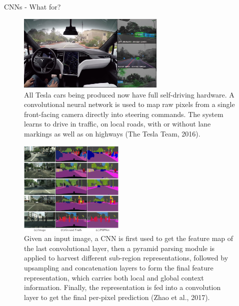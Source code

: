 \begin{vbframe}{CNNs - What for?}
  \begin{figure}
    \centering
    \includegraphics[width=7cm]{figure/tesla_autopilot.jpg}
    \caption{All Tesla cars being produced now have full self-driving hardware. A convolutional neural network is used to map raw pixels from a single front-facing camera directly into steering commands. The system learns to drive in traffic, on local roads, with or without lane markings as well as on highways (The Tesla Team, 2016).}
  \end{figure}
\framebreak

\begin{figure}
    \centering
    \includegraphics[width=5cm]{figure/cityscapes_visual.png}
    \caption{Given an input image, a CNN is first used to get the feature map of the last convolutional layer, then a pyramid parsing module is applied to harvest different sub-region representations, followed by upsampling and concatenation layers to form the final feature representation, which carries both local and global context information. Finally, the representation is fed into a convolution layer to get the final per-pixel prediction (Zhao et al., 2017). }%
  \end{figure}
\framebreak


\end{vbframe}
